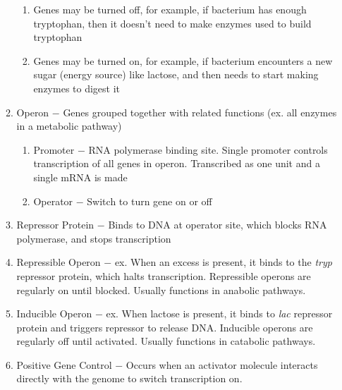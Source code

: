 \documentclass[12pt]{article}
\begin{document}
\begin{itemize}
\begin{enumerate}
        \begin{enumerate}

          \item Genes may be turned off, for example, if bacterium has enough tryptophan, then it doesn't need to make enzymes used to build tryptophan

          \item Genes may be turned on, for example, if bacterium encounters a new sugar (energy source) like lactose, and then needs to start making enzymes to digest it

        \end{enumerate}

      \item Operon $-$ Genes grouped together with related functions (ex. all enzymes in a metabolic pathway)

        \begin{enumerate}

          \item Promoter $-$ RNA polymerase binding site. Single promoter controls transcription of all genes in operon. Transcribed as one unit and a single mRNA is made

          \item Operator $-$ Switch to turn gene on or off

        \end{enumerate}

      \item Repressor Protein $-$ Binds to DNA at operator site, which blocks RNA polymerase, and stops transcription

      \item Repressible Operon $-$ ex. When an excess is present, it binds to the \textit{tryp} repressor protein, which halts transcription. Repressible operons are regularly on until blocked. Usually functions in anabolic pathways.

      \item Inducible Operon $-$ ex. When lactose is present, it binds to \textit{lac} repressor protein and triggers repressor to release DNA. Inducible operons are regularly off until activated. Usually functions in catabolic pathways.

      \item Positive Gene Control $-$ Occurs when an activator molecule interacts directly with the genome to switch transcription on.

        \begin{enumerate}


\end{enumerate}
\end{enumerate}
\end{itemize}
\end{document}
